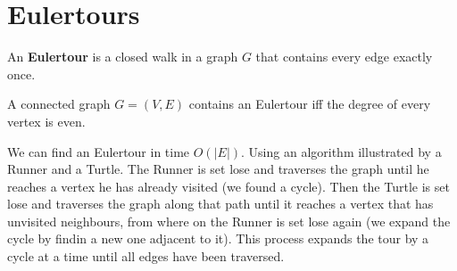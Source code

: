 \section{Eulertours}

\begin{definition}

                An \textbf{Eulertour} is a closed walk in a graph $G$ that contains every edge exactly once.
            
\end{definition}

\begin{theorem}

                A connected graph $G = (V, E)$ contains an Eulertour iff the degree of every vertex is even.
            
\end{theorem}

            We can find an Eulertour in time $O(|E|)$. Using an algorithm illustrated by a Runner and a Turtle. The
            Runner is set lose and traverses the graph until he reaches a vertex he has already visited (we found a
            cycle). Then the Turtle
            is set lose and traverses the graph along that path until it reaches a vertex that has unvisited neighbours,
            from where on the Runner is set lose again (we expand the cycle by findin a new one adjacent to it). This
            process expands the tour by a cycle at a time until all
            edges have been traversed.
        